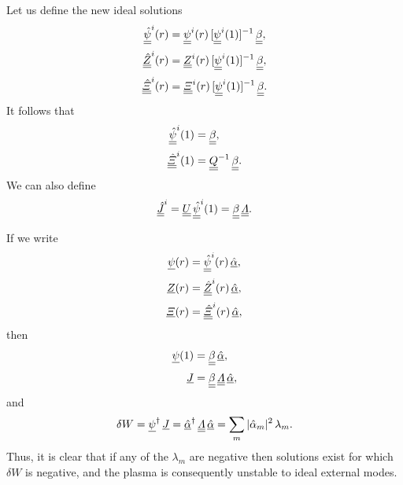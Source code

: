 \documentclass[12pt,prb,aps,notitlepage]{revtex4-1}
\begin{document}
Let us define the new ideal solutions
\begin{align}
\underline{\underline{\hat{\psi}}}^i(r)&=\underline{\underline{\psi}}^i(r)\,[\underline{\underline{\psi}}^i(1)]^{-1}\,\underline{\underline{\beta}},\\[0.5ex]
\underline{\underline{\hat{Z}}}^i(r)   &=\underline{\underline{Z}}^i(r)\,[\underline{\underline{\psi}}^{i}(1)]^{-1}\,\underline{\underline{\beta}},\\[0.5ex]
\underline{\underline{\hat{\mit\Xi}}}^i(r)   &=\underline{\underline{\mit\Xi}}^i(r)\,[\underline{\underline{\psi}}^{i}(1)]^{-1}\,\underline{\underline{\beta}}.
\end{align}
It follows that
\begin{align}
\underline{\underline{\hat{\psi}}}^i(1)&=\underline{\underline{\beta}},\\[0.5ex]
\underline{\underline{\hat{\mit\Xi}}}^i(1)&=\underline{\underline{Q}}^{-1}\,\underline{\underline{\beta}}.
\end{align}
We can also define
\begin{equation}
\underline{\underline{\hat{J}}}^i=\underline{\underline{U}}\,\underline{\underline{\hat{\psi}}}^i(1)= \underline{\underline{\beta}}\,\underline{\underline{\mit\Lambda}}.
\end{equation}

If we write
\begin{align}
\underline{\psi}(r)&= \underline{\underline{\hat{\psi}}}^i(r)\,\underline{\hat{\alpha}},\\[0.5ex]
\underline{Z}(r)&= \underline{\underline{\hat{Z}}}^i(r)\,\underline{\hat{\alpha}},\\[0.5ex]
\underline{{\mit\Xi}}(r)&= \underline{\underline{\hat{\mit\Xi}}}^i(r)\,\underline{\hat{\alpha}},
\end{align}
then
\begin{align}
\underline{\psi}(1) &=\underline{\underline{\beta}}\,\underline{\hat{\alpha}},\\[0.5ex]
\underline{J} &=\underline{\underline{\beta}}\,\underline{\underline{\mit\Lambda}}\,\underline{\hat{\alpha}},
\end{align}
and 
\begin{equation}
 \delta W= \underline{\psi}^\dag\,\underline{J}=\underline{\hat{\alpha}}^\dag\,\underline{\underline{{\mit\Lambda}}}\,\underline{\hat{\alpha}}= \sum_m |\hat{\alpha}_m|^2\,\lambda_m.
 \end{equation}
Thus, it is clear that if any of the $\lambda_m$ are negative then solutions exist for which $\delta W$ is negative, and the plasma
is consequently unstable to ideal external modes.
\end{document}
